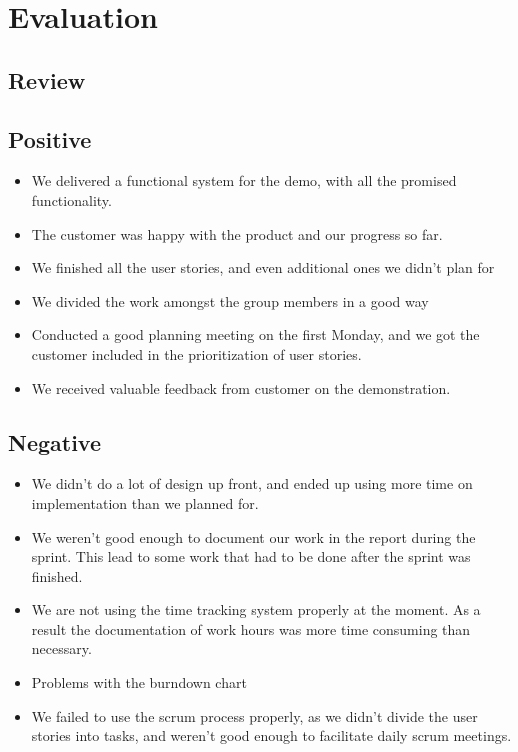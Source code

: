 \section{Evaluation}
\subsection{Review}
\subsection{Positive}

\begin{itemize}
\item We delivered a functional system for the demo, with all the promised functionality.
\item The customer was happy with the product and our progress so far.
\item We finished all the user stories, and even additional ones we didn't plan for
\item We divided the work amongst the group members in a good way
\item Conducted a good planning meeting on the first Monday, and we got the customer included in the prioritization of user stories.
\item We received valuable feedback from customer on the demonstration.
\end{itemize}

\subsection{Negative}
\begin{itemize}
\item We didn't do a lot of design up front, and ended up using more time on implementation than we planned for.
\item We weren't good enough to document our work in the report during the sprint. This lead to some work that had to be done after the sprint was finished.
\item We are not using the time tracking system properly at the moment. As a result the documentation of work hours was more time consuming than necessary.
\item Problems with the burndown chart
\item We failed to use the scrum process properly, as we didn't divide the user stories into tasks, and weren't good enough to facilitate daily scrum meetings.
\end{itemize}

